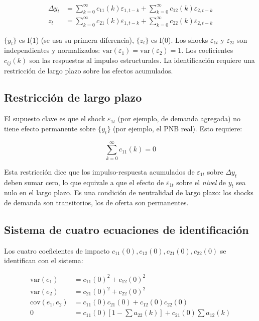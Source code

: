 \documentclass[12pt]{article}
\begin{document}
\begin{align}
\Delta y_t &= \sum_{k=0}^{\infty} c_{11}(k)\varepsilon_{1,t-k} + \sum_{k=0}^{\infty} c_{12}(k)\varepsilon_{2,t-k} \\
z_t &= \sum_{k=0}^{\infty} c_{21}(k)\varepsilon_{1,t-k} + \sum_{k=0}^{\infty} c_{22}(k)\varepsilon_{2,t-k}
\end{align}

\begin{intuicionmat}
$\{y_t\}$ es I(1) (se usa su primera diferencia), $\{z_t\}$ es I(0). Los shocks $\varepsilon_{1t}$ y $\varepsilon_{2t}$ son independientes y normalizados: $\text{var}(\varepsilon_1) = \text{var}(\varepsilon_2) = 1$. Los coeficientes $c_{ij}(k)$ son las respuestas al impulso estructurales. La identificaci\'on requiere una restricci\'on de largo plazo sobre los efectos acumulados.
\end{intuicionmat}

\subsection{Restricci\'on de largo plazo}

El supuesto clave es que el shock $\varepsilon_{1t}$ (por ejemplo, de demanda agregada) no tiene efecto permanente sobre $\{y_t\}$ (por ejemplo, el PNB real). Esto requiere:

\begin{equation}
\sum_{k=0}^{\infty} c_{11}(k) = 0
\end{equation}

\begin{intuicionmat}
Esta restricci\'on dice que los impulso-respuesta acumulados de $\varepsilon_{1t}$ sobre $\Delta y_t$ deben sumar cero, lo que equivale a que el efecto de $\varepsilon_{1t}$ sobre el \textit{nivel} de $y_t$ sea nulo en el largo plazo. Es una condici\'on de neutralidad de largo plazo: los shocks de demanda son transitorios, los de oferta son permanentes.
\end{intuicionmat}

\subsection{Sistema de cuatro ecuaciones de identificaci\'on}

Los cuatro coeficientes de impacto $c_{11}(0), c_{12}(0), c_{21}(0), c_{22}(0)$ se identifican con el sistema:

\begin{align}
\text{var}(e_1) &= c_{11}(0)^2 + c_{12}(0)^2 \label{bq1}\\
\text{var}(e_2) &= c_{21}(0)^2 + c_{22}(0)^2 \label{bq2}\\
\text{cov}(e_1,e_2) &= c_{11}(0)c_{21}(0) + c_{12}(0)c_{22}(0) \label{bq3}\\
0 &= c_{11}(0)\left[1 - \sum a_{22}(k)\right] + c_{21}(0)\sum a_{12}(k) \label{bq4}
\end{align}
\end{document}
